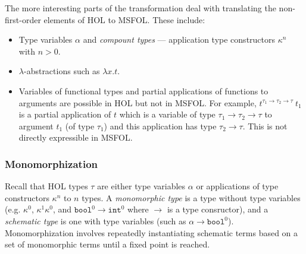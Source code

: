 \documentclass{article}
\begin{document}
	The more interesting parts of the 
	transformation deal with 
	translating the non-first-order
	elements of HOL to MSFOL. These 
	include:
	\begin{itemize}
		\item Type variables $\alpha$
		and \textit{compount types} ---
		application type constructors
		$\kappa^n$ with $n > 0$.
		\item $\lambda$-abstractions 
		such as $\lambda x. t$.
		\item Variables of functional 
		types and partial applications 
		of functions to arguments are 
		possible in HOL but not in 
		MSFOL. For example, 
		$t^{\tau_1 \to \tau_2 \to 
		\tau}\ t_1$ is a 
		partial application of $t$ 
		which is a variable of type 
		$\tau_1 \to \tau_2 \to \tau$
		to argument $t_1$ (of type 
		$\tau_1$) and this 
		application has type 
		$\tau_2 \to \tau$.
		This is not directly 
		expressible in MSFOL.
	\end{itemize}

	\subsubsection{Monomorphization}
		Recall that HOL types $\tau$ are 
		either type	variables $\alpha$ or 
		applications of type constructors 
		$\kappa^n$ to $n$ types.
		A \textit{monomorphic type} is a
		type without type variables 
		(e.g. $\kappa^0$, $\kappa^1 
		\kappa^0$, and $\texttt{bool}^0 
		\to \texttt{int}^0$ 
		where $\to$ is 
		a type consructor), and 
		a \textit{schematic type} is one 
		with type variables (such as 
		$\alpha \to \texttt{bool}^0$). 
		Monomorphization involves 
		repeatedly instantiating schematic
		terms based on a set of 
		monomorphic terms until a fixed 
		point is reached.
		
\end{document}
